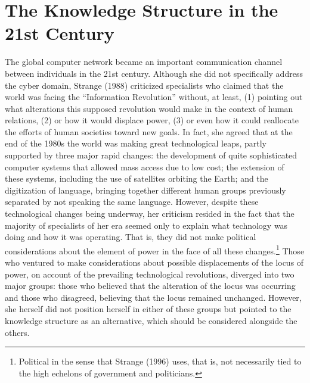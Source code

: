 \section{The Knowledge Structure in the 21st Century}

The global computer network became an important communication channel between individuals in the 21st century. Although she did not specifically address the cyber domain, Strange (1988) criticized specialists who claimed that the world was facing the ``Information Revolution'' without, at least, (1) pointing out what alterations this supposed revolution would make in the context of human relations, (2) or how it would displace power, (3) or even how it could reallocate the efforts of human societies toward new goals. In fact, she agreed that at the end of the 1980s the world was making great technological leaps, partly supported by three major rapid changes: the development of quite sophisticated computer systems that allowed mass access due to low cost; the extension of these systems, including the use of satellites orbiting the Earth; and the digitization of language, bringing together different human groups previously separated by not speaking the same language. However, despite these technological changes being underway, her criticism resided in the fact that the majority of specialists of her era seemed only to explain what technology was doing and how it was operating. That is, they did not make political considerations about the element of power in the face of all these changes.\footnote{Political in the sense that Strange (1996) uses, that is, not necessarily tied to the high echelons of government and politicians.} Those who ventured to make considerations about possible displacements of the locus of power, on account of the prevailing technological revolutions, diverged into two major groups: those who believed that the alteration of the locus was occurring and those who disagreed, believing that the locus remained unchanged. However, she herself did not position herself in either of these groups but pointed to the knowledge structure as an alternative, which should be considered alongside the others.

